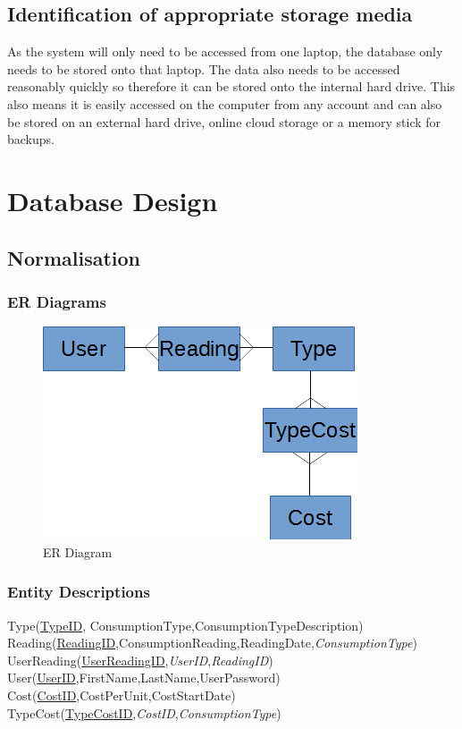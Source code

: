 \subsection{Identification of appropriate storage media}
As the system will only need to be accessed from one laptop, the database only needs to be stored onto that laptop. The data also needs to be accessed reasonably quickly so therefore it can be stored onto the internal hard drive. This also means it is easily accessed on the computer from any account and can also be stored on an external hard drive, online cloud storage or a memory stick for backups.
\section{Database Design}

\subsection{Normalisation}

\subsubsection{ER Diagrams}
\begin{figure}[H]
\includegraphics{./design/ER Diagrams.png}
\caption{ER Diagram}
\end{figure}

\subsubsection{Entity Descriptions}
Type(\underline{TypeID}, ConsumptionType,ConsumptionTypeDescription) \\
Reading(\underline{ReadingID},ConsumptionReading,ReadingDate,\emph{ConsumptionType}) \\
UserReading(\underline{UserReadingID},\emph{UserID},\emph{ReadingID}) \\
User(\underline{UserID},FirstName,LastName,UserPassword) \\
Cost(\underline{CostID},CostPerUnit,CostStartDate) \\
TypeCost(\underline{TypeCostID},\emph{CostID},\emph{ConsumptionType})\\

